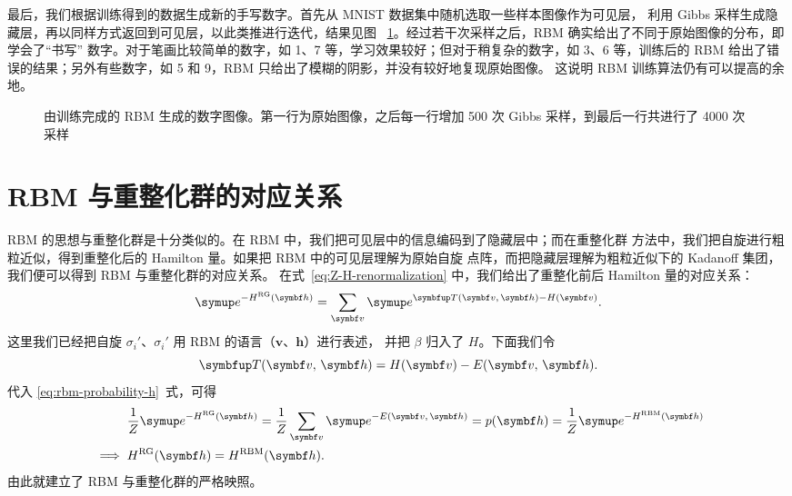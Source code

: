 最后，我们根据训练得到的数据生成新的手写数字。首先从 MNIST 数据集中随机选取一些样本图像作为可见层，
利用 Gibbs 采样生成隐藏层，再以同样方式返回到可见层，以此类推进行迭代，结果见图~%
\ref{fig:mnist-samples}。经过若干次采样之后，RBM 确实给出了不同于原始图像的分布，即学会了“书写”
数字。对于笔画比较简单的数字，如 1、7 等，学习效果较好；但对于稍复杂的数字，如 3、6 等，训练后的
RBM 给出了错误的结果；另外有些数字，如 5 和 9，RBM 只给出了模糊的阴影，并没有较好地复现原始图像。
这说明 RBM 训练算法仍有可以提高的余地。

\begin{figure}[htb]
  \centering
  \caption{由训练完成的 RBM 生成的数字图像。第一行为原始图像，之后每一行增加 \num{500} 次 Gibbs 采样，到最后一行共进行了 \num{4000} 次采样}
  \label{fig:mnist-samples}
\end{figure}

\section{RBM 与重整化群的对应关系}

RBM 的思想与重整化群是十分类似的。在 RBM 中，我们把可见层中的信息编码到了隐藏层中；而在重整化群
方法中，我们把自旋进行粗粒近似，得到重整化后的 Hamilton 量。如果把 RBM 中的可见层理解为原始自旋
点阵，而把隐藏层理解为粗粒近似下的 Kadanoff 集团，我们便可以得到 RBM 与重整化群的对应关系。
在式~\eqref{eq:Z-H-renormalization} 中，我们给出了重整化前后 Hamilton 量的对应关系：
\begin{equation}
    \ee^{-H^{\text{RG}}(\bm{h})}
  = \sum_{\bm{v}} \ee^{\opT(\bm{v},\,\bm{h})-H(\bm{v})}.
\end{equation}
这里我们已经把自旋 $\sigma_i'$、$\sigma_i'$ 用 RBM 的语言（$\bm{v}$、$\bm{h}$）进行表述，
并把 $\beta$ 归入了 $H$。下面我们令
\begin{equation}
  \opT(\bm{v},\,\bm{h}) = H(\bm{v}) - E(\bm{v},\,\bm{h}).
\end{equation}
代入 \eqref{eq:rbm-probability-h}~式，可得
\begin{align}
  &\mathrel{\phantom{\implies}}
    \frac{1}{Z} \ee^{-H^{\text{RG}}(\bm{h})}
  = \frac{1}{Z} \sum_{\bm{v}} \ee^{-E(\bm{v},\,\bm{h})}
  = p(\bm{h})
  = \frac{1}{Z} \ee^{-H^{\text{RBM}}(\bm{h})} \notag \\
  &\implies H^{\text{RG}}(\bm{h}) = H^{\text{RBM}}(\bm{h}).
\end{align}
由此就建立了 RBM 与重整化群的严格映照。

